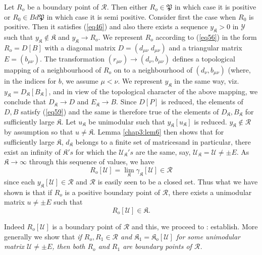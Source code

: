 Let $R_o $ be a boundary point of $ \mathscr{R} $. Then either $ R_o
\in \mathfrak{P} $ in which case it is positive or $ R_0 \in B d
\mathfrak{P} $ in which case it is  semi positive. Consider first the
case when $R_0 $ is positive. Then it satisfies (\ref{eq46}) and also there
exists a sequence  $ y_\mathfrak{K} > 0 $ in $ \mathscr{Y} $ such that
$ y_\mathfrak{K} \not\in \mathfrak{K} $ and $ y_\mathfrak{K}
\rightarrow R_o $. We represent $R_o$ according  to (\ref{eq56}) in the
form $R_o = D [ B ] $ with a diagonal matrix $ D= ( d_{\mu \nu}\; d_{\mu
  \nu} ) $  and a triangular matrix $ E = ( b_{\mu \nu} ) $. The
transformation $ ( r_{\mu \nu}) \rightarrow ( d_\nu, b_{\mu \nu} ) $
defines  a topological  mapping of a neighbourhood of $ R_o $  on to a
neighbourhood of $ ( d_\nu , b_{\mu\nu} ) $ (where, in the
indices for $b$, we assume $ \mu < \nu $. We represent $
y_\mathfrak{K}$ in the same way, viz. $y_\mathfrak{K} =
D_\mathfrak{K} [ B_\mathfrak{K} ]$, and in view of the topological
character of the above mapping, we conclude that $D_\mathfrak{K} \to
D$ and $E_\mathfrak{K} \to B$. Since $D [P]$ is reduced, the elements
of $D, B$ satisfy 
(\ref{eq59}) and the same is therefore true of the elements of
$D_\mathfrak{K} , B_\mathfrak{K} $ for sufficiently large $ \mathfrak{K}
$. Let $ u_\mathfrak{K} $ be unimodular such that $ y_\mathfrak{K} [
  u_\mathfrak{K} ] $ is reduced. $ y_\mathfrak{K} \not\in
\mathscr{R}$ by assumption so that $ u \neq \mathfrak{K} $. Lemma
\ref{chap3:lem6} 
then shows that for sufficiently large $\mathfrak{K}$, $d_\mathfrak{K} $
belongs to a finite set  of  matrices\pageoriginale and in particular,
there exist an 
infinity of $ \mathfrak{K}'s $ for which the
$\mathcal{U}_\mathfrak{K}'s$ are the same, say, 
$\mathcal{U}_\mathfrak{K} = \mathcal{U} \neq \pm E$. As 
$\mathfrak{K} \rightarrow \infty $ through this sequence of values, we 
have  
$$ 
R_o [ \mathcal{U} ] = \lim_\mathfrak{K} \gamma_\mathfrak{K} [
  \mathcal{U} ] \in \mathscr{R}  
$$
 since each $ y_\mathfrak{K} [ \mathcal{U} ] \in \mathscr{R} $ and
 $\mathscr{R}$ is easily seen to be a closed set. Thus what we have
 shown is that if $ R_o $ is  a positive boundary point of $
 \mathscr{R}$, there exists a unimodular matrix $ u \neq \pm E $
 such that  
 \begin{equation*} 
R_o [ \mathcal{U} ] \in \mathfrak{K}. \tag{66}\label{eq66}  
 \end{equation*}
 
 Indeed $R_o [ \mathcal{U} ] $ is a boundary point of $ \mathscr{R}
 $ and this, we proceed to : establish. More generally we show that
 \textit{if $ R_o , R_1 \in \mathscr{R} $ and $ \mathfrak{K}_1 = \mathfrak{K}_o [
     \mathcal{U} ] $ for some unimodular matrix $ \mathcal{U} \neq \pm
   E $, then both $R_o$ and $  R_1 $ are boundary points of $
   \mathscr{R} $.}  
  
